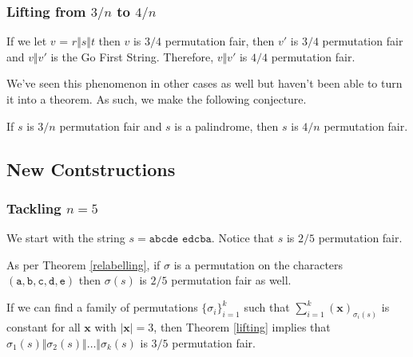 \documentclass[aspectratio=169]{beamer}
\begin{document}
\begin{frame}[triangle=siiblue]
\frametitle{Lifting from $3/n$ to $4/n$}
If we let $v$ = $r \Vert s \Vert t$ then $v$ is $3/4$ permutation fair, then $v'$ is $3/4$ permutation fair and $v \Vert v'$ is the Go First String. Therefore, $v \Vert v'$ is $4/4$ permutation fair.

\vfill

We've seen this phenomenon in other cases as well but haven't been able to turn it into a theorem.  As such, we make the following conjecture.

\vfill

\begin{siiconjecture}[label=lift_34]{}{}
If $s$ is $3/n$ permutation fair and $s$ is a palindrome, then $s$ is $4/n$ permutation fair.
\end{siiconjecture}
\end{frame}

\subsection{New Contstructions}
\begin{frame}[triangle=siiblue]
\frametitle{Tackling $n=5$}
We start with the string $s = \texttt{abcde edcba}$. Notice that $s$ is $2/5$ permutation fair.

\vfill

As per Theorem \ref{relabelling},  if $\sigma$ is a permutation on the characters $(\texttt{a}, \texttt{b},\texttt{c},\texttt{d},\texttt{e})$ then $\sigma(s)$ is $2/5$ permutation fair as well.

\vfill

If we can find a family of permutations $\{\sigma_i\}_{i=1}^k$ such that $\sum_{i=1}^k (\mathbf{x})_{\sigma_i(s)}$ is constant for all $\mathbf{x}$ with $|\mathbf{x}| = 3$, then Theorem \ref{lifting} implies that $\sigma_1(s) \Vert \sigma_2(s) \Vert \ldots \Vert \sigma_k(s)$ is $3/5$ permutation fair. 
\end{frame}
\end{document}
